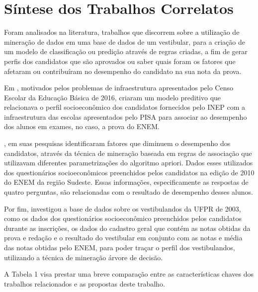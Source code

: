 \section{Síntese dos Trabalhos Correlatos}

\par
Foram analisados na literatura, trabalhos que discorrem sobre a utilização de mineração de dados em uma base de dados de um vestibular, para a criação de um modelo de classificação ou predição através de regras criadas, a fim de gerar perfis dos candidatos que são aprovados ou saber quais foram os fatores que afetaram ou contribuíram no desempenho do candidato na sua nota da prova.

\par
Em , motivados pelos problemas de infraestrutura apresentados pelo Censo Escolar da Educação Básica de 2016, criaram um modelo preditivo que relacionava o perfil socioeconômico dos candidatos fornecidos pelo INEP com a infraestrutura das escolas apresentados pelo PISA para associar ao desempenho dos alunos em exames, no caso, a prova do ENEM.

\par
{}, em suas pesquisas identificaram fatores que diminuem o desempenho dos candidatos, através da técnica de mineração baseada em regras de associação que utilizavam diferentes parametrizações do algoritmo apriori. Dados esses utilizados dos questionários socioeconômicos preenchidos pelos candidatos na edição de 2010 do ENEM da região Sudeste. Essas informações, especificamente as respostas de quatro perguntas, são relacionadas com o resultado de desempenho desses alunos.

\par
Por fim,  investigou a base de dados sobre os vestibulandos da UFPR de 2003, como os dados dos questionários socioeconômico preenchidos pelos candidatos durante as inscrições, os dados do cadastro geral que contém as notas obtidas da prova e redação e o resultado do vestibular em conjunto com as notas e média das notas obtidas pelo ENEM, para poder traçar o perfil dos vestibulandos, utilizando a técnica de mineração árvore de decisão.

\par
A Tabela 1 visa prestar uma breve comparação entre as características chaves dos trabalhos relacionados e as propostas deste trabalho.

